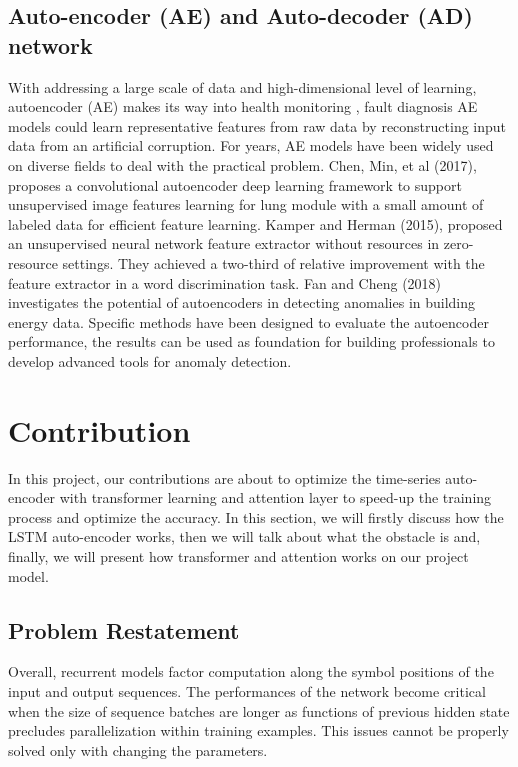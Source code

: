 \documentclass{article}
\begin{document}
\subsection{Auto-encoder (AE) and Auto-decoder (AD) network}
With addressing a large scale of data and high-dimensional level of learning, autoencoder (AE) makes its way into health monitoring \cite{AuthorRZ}, fault diagnosis AE models could learn representative features from raw data by reconstructing input data from an artificial corruption. For years, AE models have been widely used on diverse fields to deal with the practical problem. Chen, Min, et al (2017), proposes a convolutional autoencoder deep learning framework to support unsupervised image
features learning for lung module with a small amount of labeled data for efficient feature learning. Kamper and Herman (2015), proposed an unsupervised neural network feature extractor without resources in zero-resource settings. They achieved a two-third of relative improvement with the feature extractor in a word discrimination task. \cite{AuthorKa} Fan and Cheng (2018) investigates the potential of autoencoders in detecting anomalies in building energy data. Specific methods have been
designed to evaluate the autoencoder performance, the results can be used as foundation for building professionals to develop advanced tools for anomaly detection. 



\section{Contribution}
In this project, our contributions are about to optimize the time-series auto-encoder with transformer learning and attention layer to speed-up the training process and optimize the accuracy. In this section, we will firstly discuss how the LSTM auto-encoder works, then we will talk about what the obstacle is and, finally, we will present how transformer and attention works on our project model.

\subsection{Problem Restatement}
Overall, recurrent models factor computation along the symbol positions of the input and output
sequences. The performances of the network become critical when the size of sequence batches are longer as functions of previous hidden state precludes parallelization within training examples. This issues cannot be properly solved only with changing the parameters. 
\end{document}
